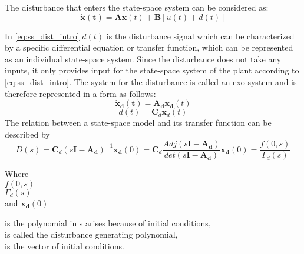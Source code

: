 The disturbance that enters the state-space system can be considered as: 
\begin{equation}
  \label{eq:ss_dist_intro}
    \mathbf{\dot{x}(t)} = \mathbf{A} \mathbf{x}(t) + \mathbf{B} [u(t) + d(t)]
  \end{equation}

In \eqref{eq:ss_dist_intro} $d(t)$ is the disturbance signal which can be characterized by a specific differential equation or transfer function, which can be represented as an individual state-space system. Since the disturbance does not take any inputs, it only provides input for the state-space system of the plant according to \eqref{eq:ss_dist_intro}. The system for the disturbance is called an exo-system and is therefore represented in a form as follows:
%
\begin{equation}
  \label{eq:ss_exo1}
    \mathbf{\dot{x}_d(t)} = \mathbf{A_d} \mathbf{x_d}(t)
  \end{equation}
%
\begin{equation}
  \label{eq:ss_exo2}
    d(t) = \mathbf{C}_d \mathbf{x}_d(t)
  \end{equation}
%
The relation between a state-space model and its transfer function can be described by 
%
\begin{equation}
  \label{eq:ss_tf}
    D(s) = \mathbf{C}_d(s\mathbf{I}-\mathbf{A_d})^{-1} \mathbf{x_d}(0) = \mathbf{C}_d \frac{Adj(s\mathbf{I}-\mathbf{A_d})}{det(s\mathbf{I}-\mathbf{A_d})} \mathbf{x_d}(0) = \frac{f(0,s)}{\Gamma_d(s)}
  \end{equation}
\begin{minipage}[t]{0.20\textwidth}
Where\\
\hspace*{8mm} $f(0,s)$ \\
\hspace*{8mm} $\Gamma_d(s)$ \\
\hspace*{8mm} and $\mathbf{x_d}(0)$  
\end{minipage}
\begin{minipage}[t]{0.68\textwidth}
\vspace*{2mm}
is the polynomial in s arises because of initial conditions,\\
is called the disturbance generating polynomial, \\
is the vector of initial conditions. 

\end{minipage}


